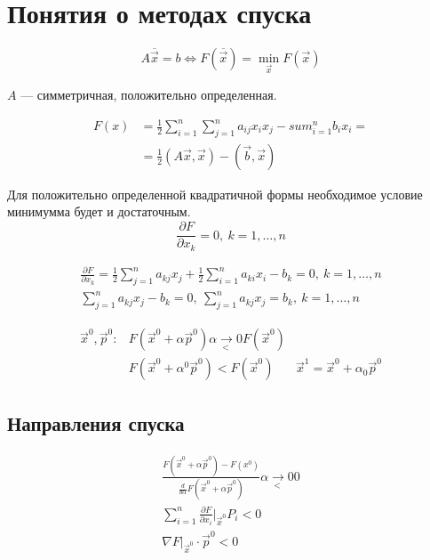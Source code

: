 \section{Понятия о методах спуска}

\[  
  A \overline{\vec{x}} = b \iff F(\overline{\vec{x}}) = \min_{\vec{x}}
  F(\vec{x})
\]

$A$ --- симметричная, положительно определенная.

\begin{align*}
  F(x) &= \frac 12 \sum_{i = 1}^n \sum_{j = 1}^n a_{ij} x_i x_j - sum_{i = 1}^n b_i x_i =\\ 
       &= \frac 12 (A\vec{x}, \vec{x}) - (\vec{b}, \vec{x})
\end{align*}

Для положительно определенной квадратичной формы необходимое условие минимумма
будет и достаточным.
\[
  \frac{\partial F}{\partial x_k} = 0,\ k = 1, \dotsc, n
\]

\begin{gather*}
  \frac{\partial F}{\partial x_k} = \frac 12 \sum_{j = 1}^n a_{kj}x_j + \frac 12
  \sum_{i = 1}^n a_{ki}x_i - b_k = 0,\ k = 1,\dotsc, n \\
  \sum_{j = 1}^n a_{kj} x_j - b_k = 0,\ \sum_{j = 1}^n a_{kj}x_j = b_k,\ k = 1,
  \dotsc, n
\end{gather*}

\begin{align*}
  \vec{x}^0, \vec{p}^0: &F(\vec{x}^0 + \alpha \vec{p}^0) \underset{<}{\alpha \to
                          0} F(\vec{x}^0)\\
                        &F(\vec{x}^0 + \alpha^0 \vec{p}^0) < F(\vec{x}^0)
                        &\vec{x}^1 = \vec{x}^0 + \alpha_0 \vec{p}^0
\end{align*}

\subsection{Направления спуска}
\begin{gather*}
  \frac{F(\vec{x}^0 + \alpha \vec{p}^0) - F(x^0)}{\frac{d}{d\alpha} F(\vec{x}^0
    + \alpha \vec{p}^0)} \underset{<}{\alpha \to 0} 0 \\
  \sum_{i = 1}^n \frac{\partial F}{\partial x_i} |_{\vec{x}^0} P_i < 0\\
  \nabla F |_{\vec{x}^0} \cdot \vec{p}^0 < 0
\end{gather*}